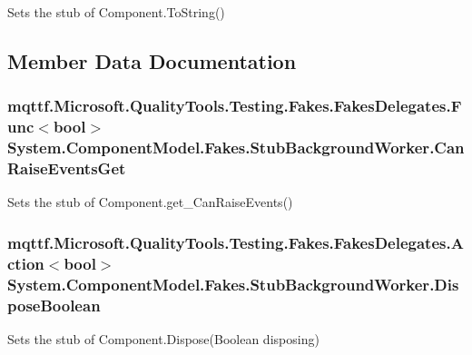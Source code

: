 Sets the stub of Component.\-To\-String()



\subsection{Member Data Documentation}
\hypertarget{class_system_1_1_component_model_1_1_fakes_1_1_stub_background_worker_a1cd0c0123eb997090616e39ad8614edf}{
\subsubsection[{Can\-Raise\-Events\-Get}]{\setlength{\rightskip}{0pt plus 5cm}mqttf.\-Microsoft.\-Quality\-Tools.\-Testing.\-Fakes.\-Fakes\-Delegates.\-Func$<$bool$>$ System.\-Component\-Model.\-Fakes.\-Stub\-Background\-Worker.\-Can\-Raise\-Events\-Get}}\label{class_system_1_1_component_model_1_1_fakes_1_1_stub_background_worker_a1cd0c0123eb997090616e39ad8614edf}


Sets the stub of Component.\-get\-\_\-\-Can\-Raise\-Events()

\hypertarget{class_system_1_1_component_model_1_1_fakes_1_1_stub_background_worker_ac78da2f5c0a6e1ed8d0dfaeaa16390bb}{
\subsubsection[{Dispose\-Boolean}]{\setlength{\rightskip}{0pt plus 5cm}mqttf.\-Microsoft.\-Quality\-Tools.\-Testing.\-Fakes.\-Fakes\-Delegates.\-Action$<$bool$>$ System.\-Component\-Model.\-Fakes.\-Stub\-Background\-Worker.\-Dispose\-Boolean}}\label{class_system_1_1_component_model_1_1_fakes_1_1_stub_background_worker_ac78da2f5c0a6e1ed8d0dfaeaa16390bb}


Sets the stub of Component.\-Dispose(\-Boolean disposing)

